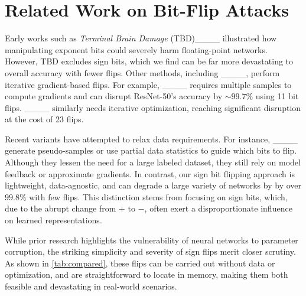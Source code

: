\section{Related Work on Bit-Flip Attacks}
\label{sec:related}
Early works such as \textit{Terminal Brain Damage} (TBD)____ illustrated how manipulating exponent bits could severely harm floating-point networks. However, TBD excludes sign bits, which we find can be far more devastating to overall accuracy with fewer flips.  
Other methods, including ____, perform iterative gradient-based flips. For example, ____ requires multiple samples to compute gradients and can disrupt ResNet-50’s accuracy by $\sim99.7\%$ using 11 bit flips. %
____ similarly needs iterative optimization, reaching significant disruption at the cost of 23 flips.  

Recent variants have attempted to relax data requirements. For instance, ____ generate pseudo-samples or use partial data statistics to guide which bits to flip. Although they lessen the need for a large labeled dataset, they still rely on model feedback or approximate gradients. In contrast, our sign bit flipping approach is lightweight, data-agnostic, and can degrade a large variety of networks by by over $99.8\%$ with few flips. This distinction stems from focusing on sign bits, which, due to the abrupt change from $+$ to $-$, often exert a disproportionate influence on learned representations.

While prior research highlights the vulnerability of neural networks to parameter corruption, the striking simplicity and severity of sign flips merit closer scrutiny. As shown in \cref{tab:compared}, these flips can be carried out without data or optimization, and are straightforward to locate in memory, making them both feasible and devastating in real-world scenarios.